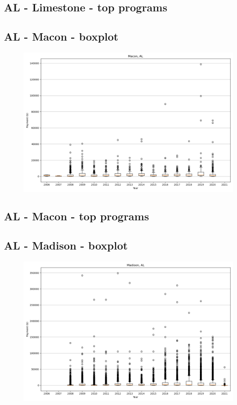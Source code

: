 \subsection*{AL - Limestone - top programs}

\newpage
\subsection*{AL - Macon - boxplot}
\begin{figure}[h]
\centering
\includegraphics[width=7in]{../output/boxplots/counties/Macon-AL_boxplot.png}
\end{figure}


\subsection*{AL - Macon - top programs}

\newpage
\subsection*{AL - Madison - boxplot}
\begin{figure}[h]
\centering
\includegraphics[width=7in]{../output/boxplots/counties/Madison-AL_boxplot.png}
\end{figure}


